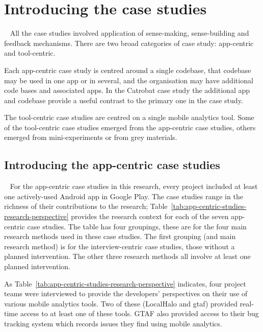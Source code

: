 \section{Introducing the case studies}~\label{section-introducing-the-case-studies}
All the case studies involved application of sense-making, sense-building and feedback mechanisms. There are two broad categories of case study: app-centric and tool-centric. 

Each app-centric case study is centred around a single codebase, that codebase may be used in one app or in several, and the organisation may have additional code bases and associated apps. In the Catrobat case study the additional app and codebase provide a useful contrast to the primary one in the case study.

The tool-centric case studies are centred on a single mobile analytics tool. Some of the tool-centric case studies emerged from the app-centric case studies, others emerged from mini-experiments or from grey materials.

\subsection{Introducing the app-centric case studies}~\label{methodology-introducing-the-app-centric-case-studies-section}
For the app-centric case studies in this research, every project included at least one actively-used Android app in Google Play. The case studies range in the richness of their contributions to the research; Table~\ref{tab:app-centric-studies-research-perspective} provides the research context for each of the seven app-centric case studies. The table has four groupings, these are for the four main research methods used in these case studies. The first grouping (and main research method) is for the interview-centric case studies, those without a planned intervention. The other three research methods all involve at least one planned intervention.

As Table~\ref{tab:app-centric-studies-research-perspective} indicates, four project teams were interviewed to provide the developers' perspectives on their use of various mobile analytics tools. Two of these (LocalHalo and \acrshort{gtaf}) provided real-time access to at least one of these tools. GTAF also provided access to their bug tracking system which records issues they find using mobile analytics.

